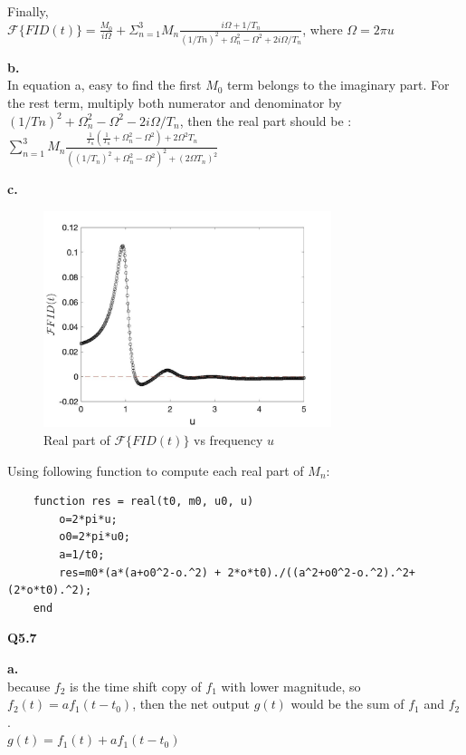 \documentclass[12pt,a4paper]{article}
\begin{document}
    \vspace{0.5cm}
    \noindent Finally, \\
    $\mathcal{F}\{FID(t)\} = \frac{M_0}{i\Omega}+\Sigma_{n=1}^3M_n\frac{i\Omega+1/T_n}{(1/Tn)^2+\Omega_n^2-\Omega^2+2i\Omega/T_n}$, where $\Omega=2\pi u$

    \textbf{b.}\\
    In equation a, easy to find the first $M_0$ term belongs to the imaginary part.  For the rest term, multiply both numerator and denominator by $(1/Tn)^2+\Omega_n^2-\Omega^2-2i\Omega/T_n$, then the real part should be : \\
    $\sum_{n=1}^3M_n\frac{\frac{1}{T_n}(\frac{1}{T_n}+\Omega_n^2-\Omega^2)+2\Omega^2T_n}{((1/T_n)^2+\Omega_n^2-\Omega^2)^2+(2\Omega T_n)^2}$

    \textbf{c.}\\
    \begin{figure}[!ht]
        \centering
        \includegraphics*[width=0.75\textwidth]{fid.jpg}
        \caption{Real part of $\mathcal{F}\{FID(t)\}$ vs frequency $u$} 
    \end{figure}

    \vspace{4cm}
    \noindent Using following function to compute each real part of $M_n$:\\ 
    \begin{lstlisting}
    function res = real(t0, m0, u0, u)
        o=2*pi*u;
        o0=2*pi*u0;
        a=1/t0;
        res=m0*(a*(a+o0^2-o.^2) + 2*o*t0)./((a^2+o0^2-o.^2).^2+(2*o*t0).^2);
    end
    \end{lstlisting}

    \newpage
    \Large{\textbf{Q5.7}}
 
    \textbf{a.}\\
    \noindent because $f_2$ is the time shift copy of $f_1$ with lower magnitude, so $f_2(t)=af_1(t-t_0)$, then the net output $g(t)$ would be the sum of $f_1$ and $f_2$.\\ 
    $g(t) = f_1(t)+af_1(t-t_0)$ 
    
\end{document}
